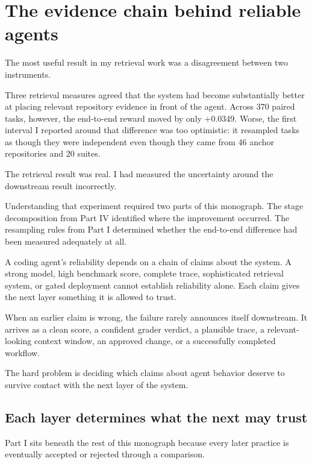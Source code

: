 \chapter{The evidence chain behind reliable agents}
\label{closing-evidence-chain}

The most useful result in my retrieval work was a disagreement between two instruments.

Three retrieval measures agreed that the system had become substantially better at placing relevant repository evidence in front of the agent. Across 370 paired tasks, however, the end-to-end reward moved by only +0.0349. Worse, the first interval I reported around that difference was too optimistic: it resampled tasks as though they were independent even though they came from 46 anchor repositories and 20 suites.

The retrieval result was real. I had measured the uncertainty around the downstream result incorrectly.

Understanding that experiment required two parts of this monograph. The stage decomposition from Part IV identified where the improvement occurred. The resampling rules from Part I determined whether the end-to-end difference had been measured adequately at all.

A coding agent's reliability depends on a chain of claims about the system. A strong model, high benchmark score, complete trace, sophisticated retrieval system, or gated deployment cannot establish reliability alone. Each claim gives the next layer something it is allowed to trust.

When an earlier claim is wrong, the failure rarely announces itself downstream. It arrives as a clean score, a confident grader verdict, a plausible trace, a relevant-looking context window, an approved change, or a successfully completed workflow.

The hard problem is deciding which claims about agent behavior deserve to survive contact with the next layer of the system.

\hypertarget{each-layer-determines-what-the-next-may-trust}{%
\section{Each layer determines what the next may trust}\label{each-layer-determines-what-the-next-may-trust}}

Part I sits beneath the rest of this monograph because every later practice is eventually accepted or rejected through a comparison.


